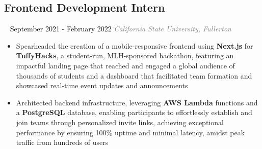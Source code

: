 \documentclass{article}
\newcommand{\resumesection}[3]{
    \subsection*{#1}
    \ 
    \normalsize
    \normalsize
    \hfill
    \textcolor{black}{#3}
    \normalsize
    \newline
    \small
    \textcolor{grey}{\emph{#2}}
}
\begin{document}
\resumesection{Frontend Development Intern}{California State University, Fullerton}{September 2021 - February 2022}
\begin{itemize}
    \item Spearheaded the creation of a mobile-responsive frontend using \textbf{Next.js} for \textbf{TuffyHacks}, a student-run, MLH-sponsored hackathon, featuring an impactful landing page that reached and engaged a global audience of thousands of students and a dashboard that facilitated team formation and showcased real-time event updates and announcements
    \item Architected backend infrastructure, leveraging \textbf{AWS Lambda} functions and a \textbf{PostgreSQL} database, enabling participants to effortlessly establish and join teams through personalized invite links, achieving exceptional performance by ensuring 100\% uptime and minimal latency, amidst peak traffic from hundreds of users
\end{itemize}
\end{document}
